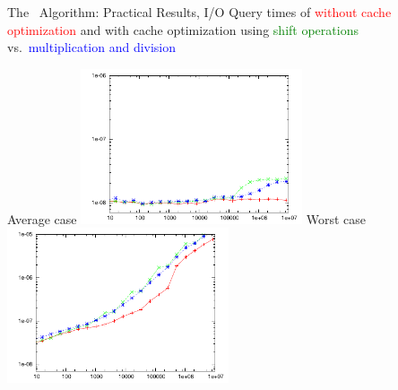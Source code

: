 \documentclass{beamer}
\begin{document}
\begin{frame}{The \fprintk\ Algorithm: Practical Results, I/O}
    Query times of \fprint[3]
    \textcolor{red}{without cache optimization}
    and with cache optimization using
    \textcolor{green}{shift operations} vs.\
    \textcolor{blue}{multiplication and division}
    \begin{multicols}{2}{
        \begin{center}
            Average case
            \includegraphics[width=0.49\textwidth,type=pdf,ext=.pdf,read=.pdf]{../src/results/length-slides-cache-fp3-rand10.plt}
            \newpage
            Worst case
            \includegraphics[width=0.49\textwidth,type=pdf,ext=.pdf,read=.pdf]{../src/results/length-slides-cache-fp3-alla.plt}
        \end{center}
    }
    \end{multicols}
\end{frame}
\end{document}
